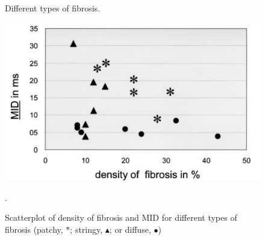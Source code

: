 \begin{figure}[!htb]
\centering
{}
\caption{Different types of fibrosis.} \label{fig:fibrosis_typology}
\end{figure}



\begin{figure}[!htb]
	\centering
	\includegraphics[height = 5 cm]{fig/fundamentals-fib-midvsdensity}
	\caption{Scatterplot of density of fibrosis and MID for different types of fibrosis (patchy, $*$; stringy, $\blacktriangle$; or diffuse, $\bullet$)}. \label{fig:midvsdensity}
\end{figure}
